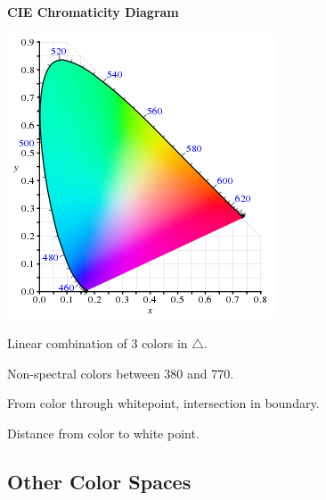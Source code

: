 \pagebreak
\textbf{CIE Chromaticity Diagram}
\vspace{-10pt}
\begin{multicols}{2}
  \includegraphics*[width=\linewidth]{assets/chromaticity.png}
  
  \begin{definition}
     Linear combination of 3 colors in \(\triangle\).
  \end{definition}

  \begin{definition}
    Non-spectral colors between 380 and 770.
  \end{definition}

  \begin{definition}
    From color through whitepoint, intersection in boundary.
  \end{definition}

  \begin{definition}[Saturation]
    Distance from color to white point.
  \end{definition}
\end{multicols}

\vspace{-10pt}
\subsection{Other Color Spaces}

